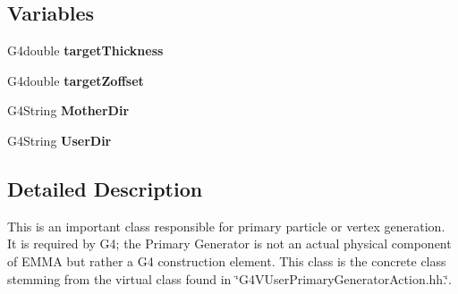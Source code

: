 \subsection*{Variables}
\begin{DoxyCompactItemize}
\item 
\hypertarget{EMMAPrimaryGeneratorAction_8hh_a168924eff042d94e1e59a05bbcdcca38}{G4double {\bfseries target\-Thickness}}\label{EMMAPrimaryGeneratorAction_8hh_a168924eff042d94e1e59a05bbcdcca38}

\item 
\hypertarget{EMMAPrimaryGeneratorAction_8hh_a7d65bdf83ece33e0fa248e3da81e825a}{G4double {\bfseries target\-Zoffset}}\label{EMMAPrimaryGeneratorAction_8hh_a7d65bdf83ece33e0fa248e3da81e825a}

\item 
\hypertarget{EMMAPrimaryGeneratorAction_8hh_a28a3faf9b4768b420044f0d81fa645b7}{G4\-String {\bfseries Mother\-Dir}}\label{EMMAPrimaryGeneratorAction_8hh_a28a3faf9b4768b420044f0d81fa645b7}

\item 
\hypertarget{EMMAPrimaryGeneratorAction_8hh_a8558631b93942e4ae79b3feb21c97c8f}{G4\-String {\bfseries User\-Dir}}\label{EMMAPrimaryGeneratorAction_8hh_a8558631b93942e4ae79b3feb21c97c8f}

\end{DoxyCompactItemize}


\subsection{Detailed Description}
This is an important class responsible for primary particle or vertex generation. It is required by G4; the Primary Generator is not an actual physical component of E\-M\-M\-A but rather a G4 construction element. This class is the concrete class stemming from the virtual class found in \char`\"{}\-G4\-V\-User\-Primary\-Generator\-Action.\-hh.\char`\"{}. 